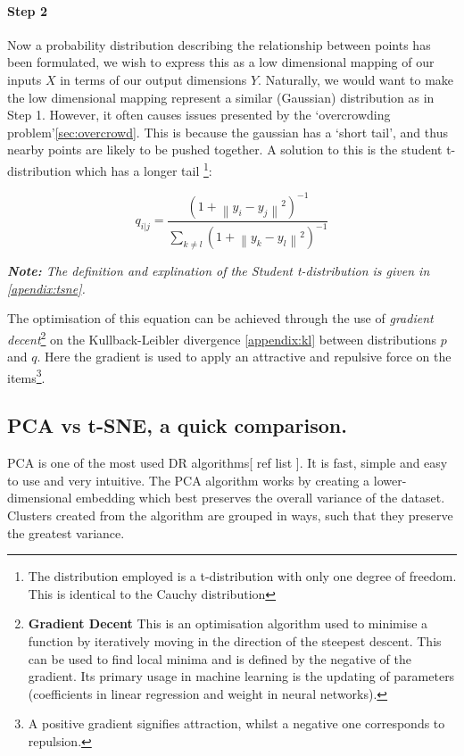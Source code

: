 \paragraph{Step 2}
Now a probability distribution describing the relationship between points has been formulated, we wish to express this as a low dimensional mapping of our inputs $X$ in terms of our output dimensions $Y$. Naturally, we would want to make the low dimensional mapping represent a similar (Gaussian) distribution as in Step 1. However, it often causes issues presented by the `overcrowding problem'\autoref{sec:overcrowd}. This is because the gaussian has a `short tail', and thus nearby points are likely to be pushed together. A solution to this is the student t-distribution which has a longer tail \footnote{The distribution employed is a t-distribution with only one degree of freedom. This is identical to the Cauchy distribution}:

\begin{equation}
q_{i|j} =\frac{(1 + \left \| y_i - y_j \right \|^2 )^{-1}}{\sum_{k \neq l} (1 + \left \| y_k - y_l \right \|^2 )^{-1} }
\end{equation}

\emph{\textbf{Note:} The definition and explination of the Student t-distribution is given in \autoref{apendix:tsne}.
}

The optimisation of this equation can be achieved through the use of \emph{gradient decent}\footnote{\textbf{Gradient Decent}
This is an optimisation algorithm used to minimise a function by iteratively moving in the direction of the steepest descent. This can be used to find local minima and is defined by the negative of the gradient. Its primary usage in machine learning is the updating of parameters (coefficients in linear regression and weight in neural networks).}
 on the Kullback-Leibler divergence \autoref{appendix:kl} between distributions $p$ and $q$. Here the gradient is used to apply an attractive and repulsive force on the items\footnote{A positive gradient signifies attraction, whilst a negative one corresponds to repulsion.}.




\subsection{PCA vs t-SNE, a quick comparison.}

PCA is one of the most used DR algorithms[ ref list ]. It is fast, simple and easy to use and very intuitive. The PCA algorithm works by creating a lower-dimensional embedding which best preserves the overall variance of the dataset. Clusters created from the algorithm are grouped in ways, such that they preserve the greatest variance.


